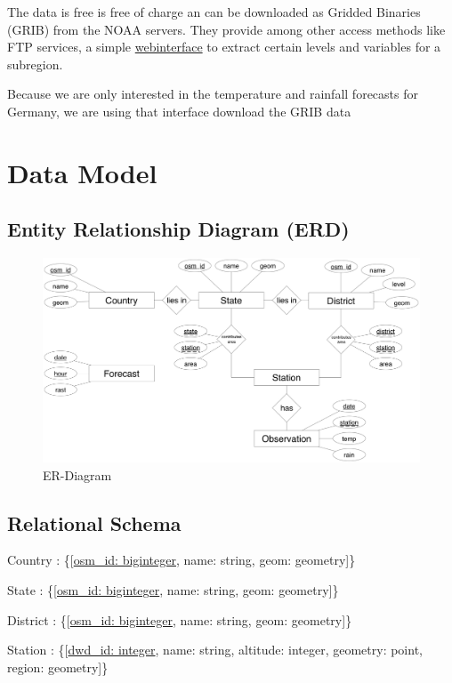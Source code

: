 \documentclass[paper=a4, fontsize=11pt]{scrartcl} %
\numberwithin{equation}{section} %
\numberwithin{figure}{section} %
\numberwithin{table}{section} %
\begin{document}
The data is free is free of charge an can be downloaded as Gridded Binaries (GRIB) 
from the NOAA servers. They provide among other access methods like FTP services, 
a simple \href{http://nomads.ncep.noaa.gov/txt_descriptions/grib_filter_doc.shtml}{webinterface}
to extract certain levels and variables for a subregion.


Because we are only interested in the temperature and rainfall forecasts for 
Germany, we are using that interface download the GRIB data

\section{Data Model}
\subsection{Entity Relationship Diagram (ERD) }
  \begin{figure}[htbp]
  \includegraphics[width=1\textwidth]{pictures/er-model}
  \caption{ER-Diagram}
  \end{figure}


\subsection{Relational Schema}
  
  Country : \{{[}\uline{osm\_id: biginteger}, name: string, geom:  geometry{]}\}

  State : \{{[}\uline{osm\_id: biginteger}, name: string, geom: geometry{]}\}

  District : \{{[}\uline{osm\_id: biginteger}, name: string, geom: geometry{]}\}

  Station : \{{[}\uline{dwd\_id: integer}, name: string, altitude: integer, geometry: point, region: geometry{]}\}
\end{document}
